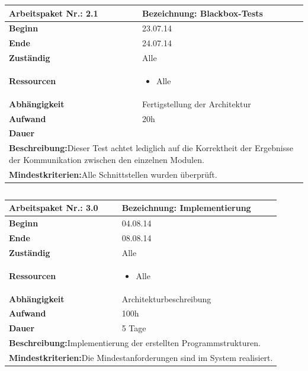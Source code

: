 \documentclass[fontsize=12pt,paper=a4,twoside]{scrartcl}
\begin{document}
\begin{tabular}{|p{5.3cm}|p{9.7cm}|}\hline
	\textbf{Arbeitspaket Nr.:} 2.1 & \textbf{Bezeichnung:} Blackbox-Tests \\ \hline \hline
	\textbf{Beginn} & 23.07.14\\ \hline
	\textbf{Ende} & 24.07.14\\ \hline
	\textbf{Zuständig} & Alle\\ \hline
	\textbf{Ressourcen} & \begin{itemize}
		\item Alle
	\end{itemize}    \\ \hline
	\textbf{Abhängigkeit} & Fertigstellung der Architektur\\ \hline
	\textbf{Aufwand} & 20h\\ \hline
	\textbf{Dauer} & \\ \hline
	\multicolumn{2}{|p{15cm}|}{\textbf{Beschreibung:}\newline Dieser Test achtet lediglich  auf die Korrektheit der Ergebnisse der Kommunikation zwischen den einzelnen Modulen. }\\ \hline
	\multicolumn{2}{|p{15cm}|}{\textbf{Mindestkriterien:}\newline Alle Schnittstellen wurden überprüft. }\\ \hline
\end{tabular}

\begin{verbatim} 
\end{verbatim}

\begin{tabular}{|p{5.3cm}|p{9.7cm}|}\hline
	\textbf{Arbeitspaket Nr.:} 3.0 & \textbf{Bezeichnung:} Implementierung\\ \hline \hline
	\textbf{Beginn} & 04.08.14\\ \hline
	\textbf{Ende} & 08.08.14\\ \hline
	\textbf{Zuständig} & Alle\\ \hline
	\textbf{Ressourcen} & \begin{itemize}
		\item Alle
	\end{itemize}    \\ \hline
	\textbf{Abhängigkeit} & Architekturbeschreibung\\ \hline
	\textbf{Aufwand} & 100h\\ \hline
	\textbf{Dauer} & 5 Tage\\ \hline
	\multicolumn{2}{|p{15cm}|}{\textbf{Beschreibung:}\newline Implementierung der erstellten Programmstrukturen. }\\ \hline
	\multicolumn{2}{|p{15cm}|}{\textbf{Mindestkriterien:}\newline Die Mindestanforderungen sind im System realisiert. }\\ \hline
\end{tabular}
\end{document}
